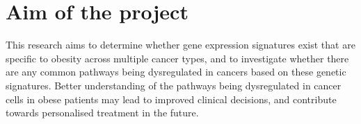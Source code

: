 \section{Aim of the project}
\label{sec:aim}

This research aims to determine whether gene expression signatures exist  that are specific to obesity across multiple cancer types, and to investigate whether there are any common pathways being dysregulated in cancers based on these genetic signatures.
Better understanding of the pathways being dysregulated in cancer cells in obese patients may lead to improved clinical decisions, and contribute towards personalised treatment in the future.

